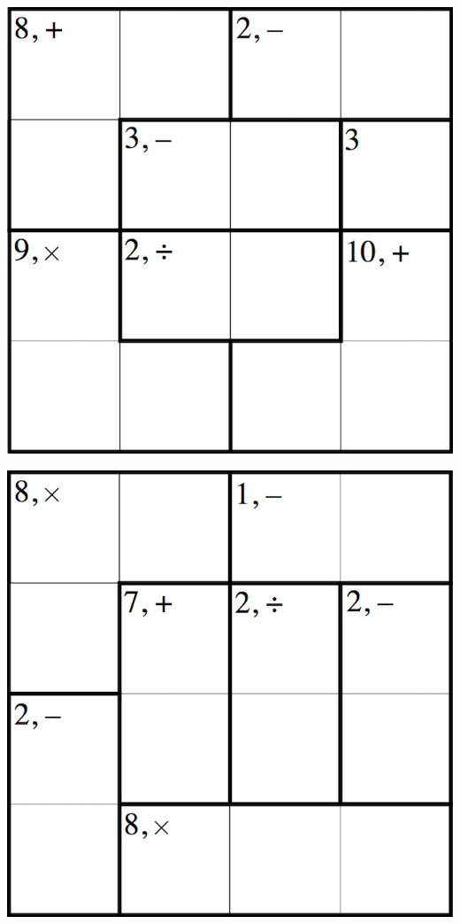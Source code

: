 
\includegraphics[scale=1]{Gambar/Lampiran/4x4_7.png}

\includegraphics[scale=1]{Gambar/Lampiran/4x4_8.png}

